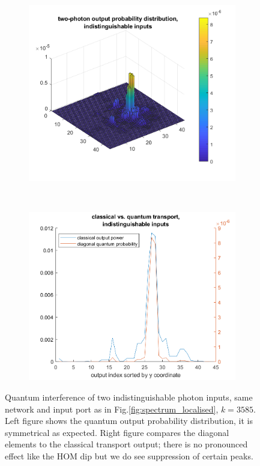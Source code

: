 \begin{itemize}
    \begin{figure}[ht]
    \centering
    \begin{subfigure}[b]{0.5\textwidth}
        \includegraphics[width=\textwidth]{ch3/fig3/T3585_Q.png}
    \end{subfigure}
    ~
    \begin{subfigure}[b]{0.45\textwidth}
        \includegraphics[width=\textwidth]{ch3/fig3/T3585_QvC.png}
    \end{subfigure}
    \caption{Quantum interference of two indistinguishable photon inputs, same network and input port as in Fig.\ref{fig:spectrum_localised}, $k=3585$. Left figure shows the quantum output probability distribution, it is symmetrical as expected. Right figure compares the diagonal elements to the classical transport output; there is no pronounced effect like the HOM dip but we do see suppression of certain peaks.}
    \label{fig:samexsamek}
\end{figure}
    

\end{itemize}
